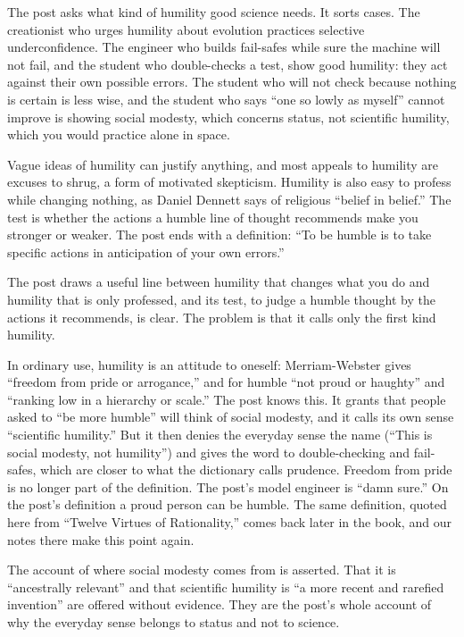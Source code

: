 \begin{afterword}
\summaryhead

The post asks what kind of humility good science needs. It sorts cases. The creationist who urges humility about evolution practices selective underconfidence. The engineer who builds fail-safes while sure the machine will not fail, and the student who double-checks a test, show good humility: they act against their own possible errors. The student who will not check because nothing is certain is less wise, and the student who says ``one so lowly as myself'' cannot improve is showing social modesty, which concerns status, not scientific humility, which you would practice alone in space.

Vague ideas of humility can justify anything, and most appeals to humility are excuses to shrug, a form of motivated skepticism. Humility is also easy to profess while changing nothing, as Daniel Dennett says of religious ``belief in belief.'' The test is whether the actions a humble line of thought recommends make you stronger or weaker. The post ends with a definition: ``To be humble is to take specific actions in anticipation of your own errors.''

\responsehead

The post draws a useful line between humility that changes what you do and humility that is only professed, and its test, to judge a humble thought by the actions it recommends, is clear. The problem is that it calls only the first kind humility.

In ordinary use, humility is an attitude to oneself: Merriam-Webster gives ``freedom from pride or arrogance,'' and for humble ``not proud or haughty'' and ``ranking low in a hierarchy or scale.'' The post knows this. It grants that people asked to ``be more humble'' will think of social modesty, and it calls its own sense ``scientific humility.'' But it then denies the everyday sense the name (``This is social modesty, not humility'') and gives the word to double-checking and fail-safes, which are closer to what the dictionary calls prudence. Freedom from pride is no longer part of the definition. The post's model engineer is ``damn sure.'' On the post's definition a proud person can be humble. The same definition, quoted here from ``Twelve Virtues of Rationality,'' comes back later in the book, and our notes there make this point again.

The account of where social modesty comes from is asserted. That it is ``ancestrally relevant'' and that scientific humility is ``a more recent and rarefied invention'' are offered without evidence. They are the post's whole account of why the everyday sense belongs to status and not to science.


\end{afterword}
